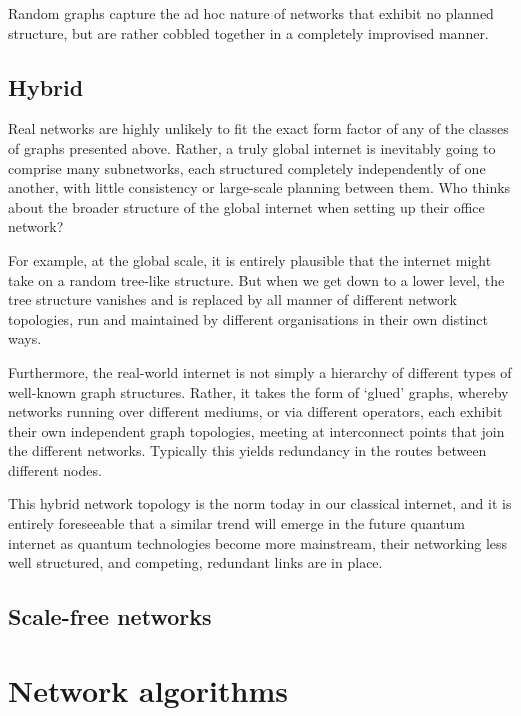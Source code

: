 \documentclass[aps,rmp,twocolumn,amsmath,amssymb,nofootinbib,superscriptaddress]{revtex4}
\newcommand{\comment}[1]{{\color{blue}{\textbf{#1}}}}
\begin{document}
Random graphs capture the ad hoc nature of networks that exhibit no planned structure, but are rather cobbled together in a completely improvised manner.

%
%

\subsection{Hybrid}

Real networks are highly unlikely to fit the exact form factor of any of the classes of graphs presented above. Rather, a truly global internet is inevitably going to comprise many subnetworks, each structured completely independently of one another, with little consistency or large-scale planning between them. Who thinks about the broader structure of the global internet when setting up their office network?

For example, at the global scale, it is entirely plausible that the internet might take on a random tree-like structure. But when we get down to a lower level, the tree structure vanishes and is replaced by all manner of different network topologies, run and maintained by different organisations in their own distinct ways.

Furthermore, the real-world internet is not simply a hierarchy of different types of well-known graph structures. Rather, it takes the form of `glued' graphs, whereby networks running over different mediums, or via different operators, each exhibit their own independent graph topologies, meeting at interconnect points that join the different networks. Typically this yields redundancy in the routes between different nodes.

This hybrid network topology is the norm today in our classical internet, and it is entirely foreseeable that a similar trend will emerge in the future quantum internet as quantum technologies become more mainstream, their networking less well structured, and competing, redundant links are in place.

%
%

\subsection{Scale-free networks}

\comment{To do}

%
%

\section{Network algorithms} \label{sec:graph_theory}
\end{document}
